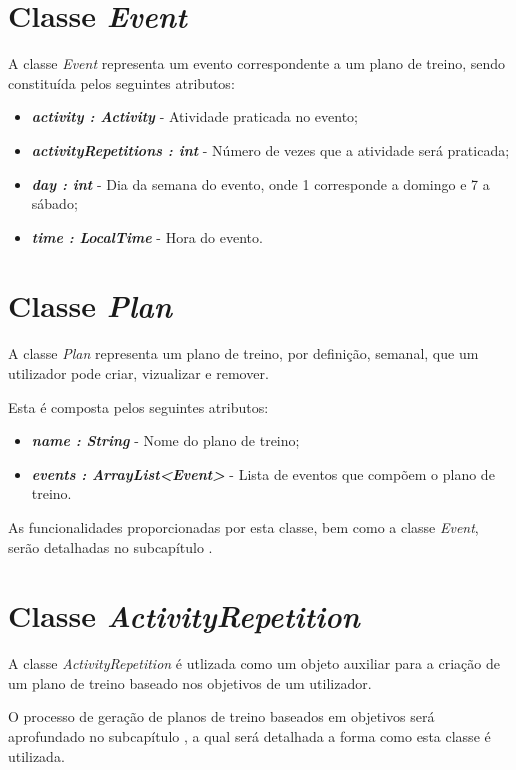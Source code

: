 \documentclass[a4paper,12pt]{scrreprt}
\begin{document}
\section{Classe \textit{Event}}
    A classe \textit{Event} representa um evento correspondente a um plano de treino, sendo constituída pelos seguintes atributos:

    \begin{itemize}
        \item \textit{\textbf{activity : Activity}} - Atividade praticada no evento;
        \item \textit{\textbf{activityRepetitions : int}} - Número de vezes que a atividade será praticada;
        \item \textit{\textbf{day : int}} - Dia da semana do evento, onde 1 corresponde a domingo e 7 a sábado;
        \item \textit{\textbf{time : LocalTime}} - Hora do evento.
    \end{itemize}

\section{Classe \textit{Plan}}
    A classe \textit{Plan} representa um plano de treino, por definição, semanal, que um utilizador pode criar, vizualizar e remover.

    Esta é composta pelos seguintes atributos:
    \begin{itemize}
        \item \textit{\textbf{name : String}} - Nome do plano de treino;
        \item \textit{\textbf{events : ArrayList<Event>}} - Lista de eventos que compõem o plano de treino.
    \end{itemize}

    As funcionalidades proporcionadas por esta classe, bem como a classe \textit{Event}, serão detalhadas no subcapítulo \textit{}.

\section{Classe \textit{ActivityRepetition}}
    A classe \textit{ActivityRepetition} é utlizada como um objeto auxiliar para a criação de um plano de treino baseado nos objetivos de um utilizador.

    O processo de geração de planos de treino baseados em objetivos será aprofundado no subcapítulo \textit{},
    a qual será detalhada a forma como esta classe é utilizada.
\end{document}
